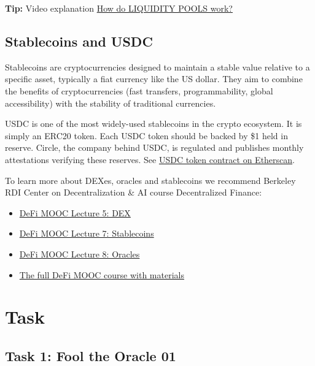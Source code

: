 \documentclass[12pt]{article}
\begin{document}
\medskip
\noindent
\textbf{Tip:} Video explanation \href{https://www.youtube.com/watch?v=cizLhxSKrAc&t=2s}{How do LIQUIDITY POOLS work?}



\subsection*{Stablecoins and USDC}

Stablecoins are cryptocurrencies designed to maintain a stable value relative to a specific asset, typically a fiat currency like the US dollar. They aim to combine the benefits of cryptocurrencies (fast transfers, programmability, global accessibility) with the stability of traditional currencies.

USDC is one of the most widely-used stablecoins in the crypto ecosystem. It is simply an ERC20 token. Each USDC token should be backed by \$1 held in reserve. Circle, the company behind USDC, is regulated and publishes monthly attestations verifying these reserves. See \href{https://etherscan.io/token/0xa0b86991c6218b36c1d19d4a2e9eb0ce3606eb48}{USDC token contract on Etherscan}.

\medskip
\noindent
To learn more about DEXes, oracles and stablecoins we recommend Berkeley RDI Center on Decentralization \& AI course Decentralized Finance:
\begin{itemize}
\item \href{https://www.youtube.com/playlist?list=PLS01nW3RtgopoR-FHiMwfoMLT-opXlfJF}{DeFi MOOC Lecture 5: DEX}
\item \href{https://www.youtube.com/playlist?list=PLS01nW3RtgopICEFsRCvT_SIjoOtGa869}{DeFi MOOC Lecture 7: Stablecoins}
\item \href{https://www.youtube.com/playlist?list=PLS01nW3Rtgoo70DT2YsBmNUol4134S9C9}{DeFi MOOC Lecture 8: Oracles}
\item \href{https://rdi.berkeley.edu/berkeley-defi/f24}{The full DeFi MOOC course with materials}
\end{itemize}

\section{Task}

\subsection*{Task 1: Fool the Oracle 01}
\end{document}
